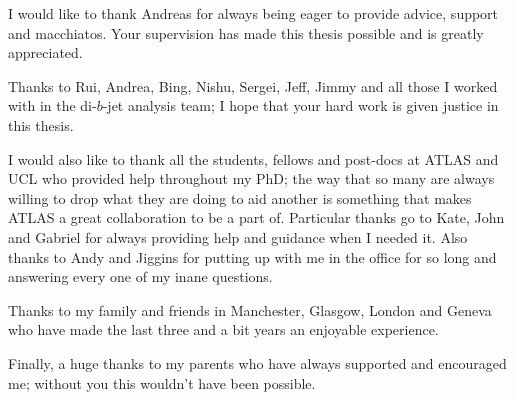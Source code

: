 \begin{acknowledgements}

I would like to thank Andreas for always being eager to provide advice, support and macchiatos.
Your supervision has made this thesis possible and is greatly appreciated.

Thanks to Rui, Andrea, Bing, Nishu, Sergei, Jeff, Jimmy and all those I worked with in the di-$b$-jet analysis team;
I hope that your hard work is given justice in this thesis.

I would also like to thank all the students, fellows and post-docs at ATLAS and UCL who provided help throughout my PhD;
the way that so many are always willing to drop what they are doing to aid another is something that makes ATLAS a great collaboration to be a part of.
Particular thanks go to Kate, John and Gabriel for always providing help and guidance when I needed it.
Also thanks to Andy and Jiggins for putting up with me in the office for so long and answering every one of my inane questions.

Thanks to my family and friends in Manchester, Glasgow, London and Geneva who have made the last three and a bit years an enjoyable experience.

Finally, a huge thanks to my parents who have always supported and encouraged me;
without you this wouldn't have been possible. 

\end{acknowledgements}

\setcounter{tocdepth}{2} 

\tableofcontents
\listoffigures
\listoftables

